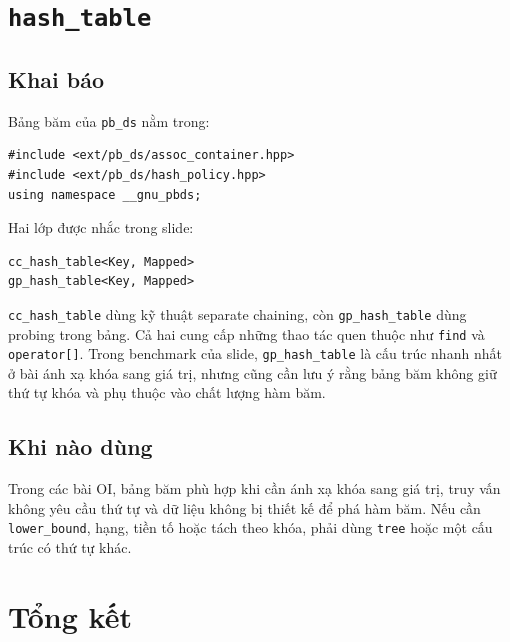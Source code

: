 \documentclass[11pt]{article}
\begin{document}
\section{\texorpdfstring{\texttt{hash\_table}}{hash table}}

\subsection{Khai báo}

Bảng băm của \texttt{pb\_ds} nằm trong:

\begin{verbatim}
#include <ext/pb_ds/assoc_container.hpp>
#include <ext/pb_ds/hash_policy.hpp>
using namespace __gnu_pbds;
\end{verbatim}

Hai lớp được nhắc trong slide:

\begingroup
\small
\begin{verbatim}
cc_hash_table<Key, Mapped>
gp_hash_table<Key, Mapped>
\end{verbatim}
\endgroup

\texttt{cc\_hash\_table} dùng kỹ thuật separate chaining, còn
\texttt{gp\_hash\_table} dùng probing trong bảng. Cả hai cung cấp những thao
tác quen thuộc như \texttt{find} và \texttt{operator[]}. Trong benchmark của
slide, \texttt{gp\_hash\_table} là cấu trúc nhanh nhất ở bài ánh xạ khóa sang
giá trị, nhưng cũng cần lưu ý rằng bảng băm không giữ thứ tự khóa và phụ thuộc
vào chất lượng hàm băm.

\subsection{Khi nào dùng}

Trong các bài OI, bảng băm phù hợp khi cần ánh xạ khóa sang giá trị, truy vấn
không yêu cầu thứ tự và dữ liệu không bị thiết kế để phá hàm băm. Nếu cần
\texttt{lower\_bound}, hạng, tiền tố hoặc tách theo khóa, phải dùng
\texttt{tree} hoặc một cấu trúc có thứ tự khác.

\section{Tổng kết}
\end{document}
